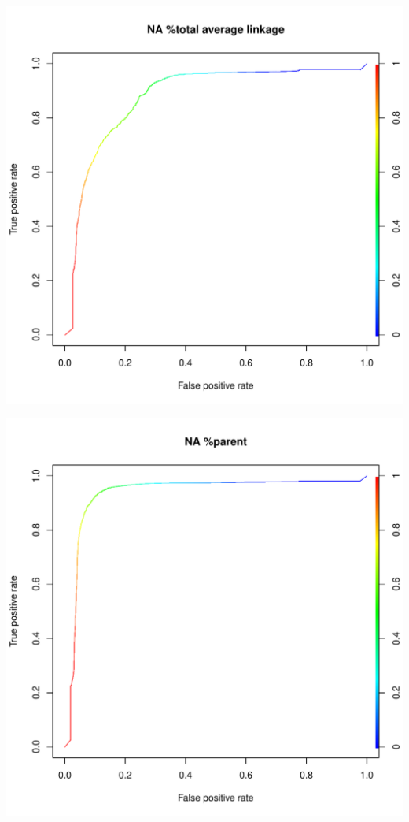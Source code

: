 \documentclass[11pt,a4paper,twoside]{report}\usepackage[]{graphicx}\usepackage[]{color}
\makeatletter
\def\maxwidth{ %
  \ifdim\Gin@nat@width>\linewidth
    \linewidth
  \else
    \Gin@nat@width
  \fi
}
\newenvironment{knitrout}{}{} %
\makeatother
\begin{document}
\begin{knitrout}
\includegraphics[width=\maxwidth]{figure/fig_code-29} 

\includegraphics[width=\maxwidth]{figure/fig_code-30} 


\end{knitrout}
\end{document}
